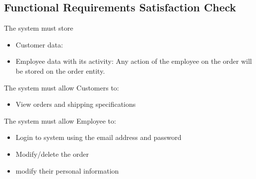\subsection{Functional Requirements Satisfaction Check}

The system must store
\begin{itemize}
	\item Customer data:
\end{itemize}
\begin{itemize}
	\item Employee data with its activity:
	Any action of the employee on the order will be stored on the order entity.
\end{itemize}

The system must allow Customers to:
\begin{itemize}
	\item View orders and shipping specifications
\end{itemize}

The system must allow Employee to:
\begin{itemize}
	\item Login to system using the email address and password
	\item Modify/delete the order
	\item modify their personal information
\end{itemize}
